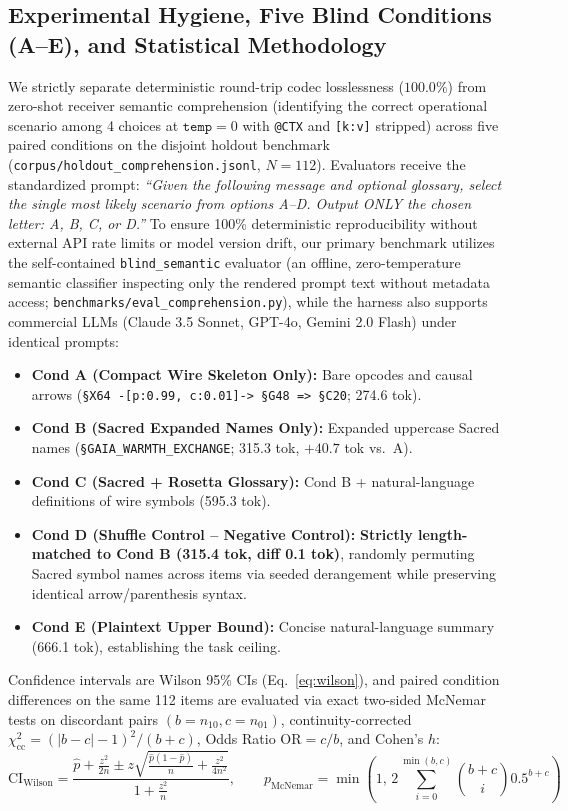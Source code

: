 \documentclass[9pt,a4paper]{extarticle}
\begin{document}
\subsection{Experimental Hygiene, Five Blind Conditions (A--E), and Statistical Methodology}
We strictly separate deterministic round-trip codec losslessness ($100.0\%$) from zero-shot receiver semantic comprehension (identifying the correct operational scenario among 4 choices at $\texttt{temp}=0$ with \texttt{@CTX} and \texttt{[k:v]} stripped) across five paired conditions on the disjoint holdout benchmark (\texttt{corpus/holdout\_comprehension.jsonl}, $N=112$). Evaluators receive the standardized prompt: \emph{``Given the following message and optional glossary, select the single most likely scenario from options A--D. Output ONLY the chosen letter: A, B, C, or D.''} To ensure 100\% deterministic reproducibility without external API rate limits or model version drift, our primary benchmark utilizes the self-contained \texttt{blind\_semantic} evaluator (an offline, zero-temperature semantic classifier inspecting only the rendered prompt text without metadata access; \texttt{benchmarks/\allowbreak eval\_comprehension.py}), while the harness also supports commercial LLMs (Claude 3.5 Sonnet, GPT-4o, Gemini 2.0 Flash) under identical prompts:
\begin{itemize}
  \item \textbf{Cond A (Compact Wire Skeleton Only):} Bare opcodes and causal arrows (\texttt{\S X64 -[p:0.99, c:0.01]-> \S G48 => \S C20}; 274.6 tok).
  \item \textbf{Cond B (Sacred Expanded Names Only):} Expanded uppercase Sacred names (\texttt{\S GAIA\_WARMTH\_EXCHANGE}; 315.3 tok, $+40.7$ tok vs.\ A).
  \item \textbf{Cond C (Sacred + Rosetta Glossary):} Cond B + natural-language definitions of wire symbols (595.3 tok).
  \item \textbf{Cond D (Shuffle Control -- Negative Control):} \textbf{Strictly length-matched to Cond B (315.4 tok, diff 0.1 tok)}, randomly permuting Sacred symbol names across items via seeded derangement while preserving identical arrow/parenthesis syntax.
  \item \textbf{Cond E (Plaintext Upper Bound):} Concise natural-language summary (666.1 tok), establishing the task ceiling.
\end{itemize}
Confidence intervals are Wilson 95\% CIs (Eq.\ \ref{eq:wilson}), and paired condition differences on the same 112 items are evaluated via exact two-sided McNemar tests on discordant pairs $(b=n_{10}, c=n_{01})$, continuity-corrected $\chi^2_{\text{cc}} = (|b-c|-1)^2/(b+c)$, Odds Ratio $\text{OR} = c/b$, and Cohen's $h$:
\begin{equation}
  \text{CI}_{\text{Wilson}} = \frac{\hat{p} + \frac{z^2}{2n} \pm z\sqrt{\frac{\hat{p}(1-\hat{p})}{n} + \frac{z^2}{4n^2}}}{1 + \frac{z^2}{n}}, \qquad
  p_{\text{McNemar}} = \min\!\left(1,\, 2\sum_{i=0}^{\min(b, c)} \binom{b+c}{i} 0.5^{b+c}\right)
  \label{eq:wilson}
\end{equation}
\end{document}
